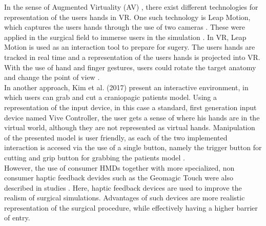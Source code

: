 In the sense of Augmented Virtuality (AV) \cite{milgram1994taxonomy}, there exist different technologies for representation of the users hands in VR.
One such technology is Leap Motion, which captures the users hands through the use of two cameras \cite{LeapMotion}.
These were applied in the surgical field to immerse users in the simulation \cite{VenkataS.Arikatla.2018,Sampogna.2017}.
In VR, Leap Motion is used as an interaction tool to prepare for sugery.
The users hands are tracked in real time and a representation of the users hands is projected into VR.
With the use of hand and finger gestures, users could rotate the target anatomy and change the point of view \cite{Sampogna.2017}.
\\ In another approach, Kim et al. (2017) present an interactive environment, in which users can grab and cut a craniopagic patients model.
Using a representation of the input device, in this case a standard, first generation input device named Vive Controller, the user gets a sense of where his hands are in the virtual world, although they are not represented as virtual hands. 
Manipulation of the presented model is user friendly, as each of the two implemented interaction is accesed via the use of a single button, namely the trigger button for cutting and grip button for grabbing the patients model \cite{.2017}.
\\ However, the use of consumer HMDs together with more specialized, non consumer haptic feedback devides such as the Geomagic Touch were also described in studies \cite{VenkataS.Arikatla.2018}.
Here, haptic feedback devices are used to improve the realism of surgical simulations.
Advantages of such devices are more realistic representation of the surgical procedure, while effectively having a higher barrier of entry.